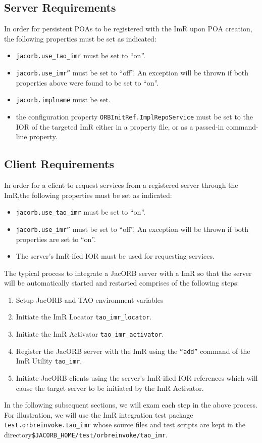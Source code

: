 \subsection{Server Requirements}

In order for persistent POAs to be registered with the ImR upon POA
creation, the following properties must be set as indicated:
\begin{itemize}
    \item {\tt jacorb.use_tao_imr} must be set to “on”.
    \item {\tt jacorb.use_imr”} must be set to “off”.  An exception will be thrown if
              both properties above were found to be set to “on”.
    \item {\tt jacorb.implname} must be set.
    \item the configuration  property {\tt ORBInitRef.ImplRepoService}
              must be set to the IOR of the targeted ImR either in a property file,
              or as a passed-in command-line property.
\end{itemize}

\subsection{Client Requirements}

In order for a client to request services from a registered server through the
ImR,the following properties must be set as indicated:
\begin{itemize}
    \item {\tt jacorb.use_tao_imr} must be set to “on”.
    \item {\tt jacorb.use_imr”} must be set to “off”.  An exception will be thrown if
              both properties are set to “on”.
    \item The server's ImR-ifed IOR must be used for requesting services.
\end{itemize}

The typical process to integrate a JacORB server with a ImR so that the
server will be automatically started and restarted comprises of the following
steps:
\begin{enumerate}
    \item Setup JacORB and TAO environment variables
    \item Initiate the ImR Locator {\tt tao\_imr\_locator}.
    \item Initiate the ImR Activator {\tt tao\_imr\_activator}.
    \item Register the JacORB server with the ImR using the
             {\tt “add”} command of the ImR Utility {\tt tao\_imr}.
    \item Initiate JacORB clients using the server's ImR-ified IOR
              references which will cause the target server to be initiated by
              the ImR Activator.
\end{enumerate}
In the following subsequent sections, we will exam each step in the above
process.  For illustration, we will use the ImR integration test package
{\tt test.orbreinvoke.tao\_imr} whose source files and test scripts are kept
in the directory{\tt \$JACORB\_HOME/test/orbreinvoke/tao\_imr}.

